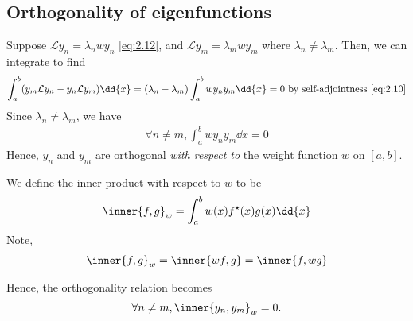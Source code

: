 \subsection{Orthogonality of eigenfunctions}
Suppose $\mathcal L y_n = \lambda_n w y_n$ \cref{eq:2.12}, and $\mathcal L y_m = \lambda_m w y_m$ where $\lambda_n \neq \lambda_m$.
Then, we can integrate to find
\begin{align*}
    \int_a^b (y_m \mathcal L y_n - y_n \mathcal L y_m) \dd{x} = (\lambda_n - \lambda_m) \int_a^b w y_n y_m \dd{x} = 0 \text{ by self-adjointness \cref{eq:2.10}}
\end{align*}
Since $\lambda_n \neq \lambda_m$, we have
\begin{align} \label{eq:2.13}
    \forall n \neq m, \int_a^b w y_n y_m \dd{x} = 0
\end{align}
Hence, $y_n$ and $y_m$ are orthogonal \textit{with respect to} the weight function $w$ on $[a,b]$.
\begin{definition}
    We define the inner product with respect to $w$ to be
    \begin{align} \label{eq:2.14}
        \inner{f,g}_w = \int_a^b w(x) f^\star(x) g(x) \dd{x}
    \end{align}
    Note,
    \begin{align*}
        \inner{f,g}_w = \inner{wf,g} = \inner{f,wg}
    \end{align*}
\end{definition}
Hence, the orthogonality relation becomes
\begin{align} \label{eq:2.15}
    \forall n \neq m, \inner{y_n, y_m}_w = 0.
\end{align}

